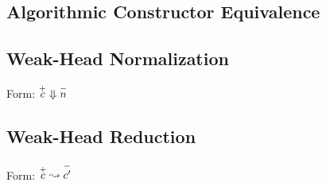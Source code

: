 \begin{grouped}{\subsection{Algorithmic Constructor Equivalence}}
\subsection{Weak-Head Normalization}
Form: $\oversetr{c}{+} \whn \oversetr{n}{-}$

\begin{mathpar}

\end{mathpar}

\subsection{Weak-Head Reduction}
Form: $\oversetr{c}{+} \whr \oversetr{c'}{-}$

\begin{mathpar}



\end{mathpar}
\end{grouped}

